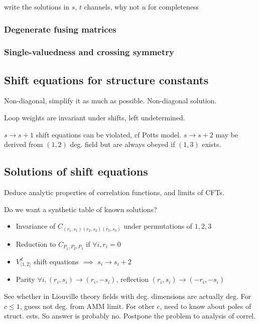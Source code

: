 \documentclass[12pt, a4paper]{article}
\theoremstyle{break}
\begin{document}
write the solutions in $s$, $t$ channels, why not $u$ for completeness

\subsubsection{Degenerate fusing matrices}

\subsubsection{Single-valuedness and crossing symmetry}

\subsection{Shift equations for structure constants}


Non-diagonal, simplify it as much as possible. Non-diagonal solution. 

Loop weights are invariant under shifts, left undetermined. 

$s\to s+1$ shift equations can be violated, cf Potts model. $s\to s+2$ may be derived from $(1,2)$ deg. field but are always obeyed if $(1,3)$ exists. 

\subsection{Solutions of shift equations}\label{sec:essc}

Deduce analytic properties of correlation functions, and limits of CFTs. 

Do we want a synthetic table of known solutions? 

\begin{itemize}
\item Invariance of $C_{(r_1,s_1)(r_2,s_2)(r_3,s_3)}$ under permutations of $1,2,3$
\item Reduction to $C_{P_1,P_2,P_3}$ if $\forall i, r_i=0$ 
 \item $V_{\langle 1,2\rangle}^d$ shift equations $\implies$ $s_i\to s_i+2$  
 \item Parity $\forall i, (r_i,s_i)\to (r_i,-s_i)$, reflection $(r_i,s_i)\to (-r_i,-s_i)$
\end{itemize}


See whether in Liouville theory fields with deg. dimensions are actually deg. For $c\leq 1$, guess not deg. from AMM limit. For other $c$, need to know about poles of struct. csts. So answer is probably no. Postpone the problem to analysis of correl. 
\end{document}
